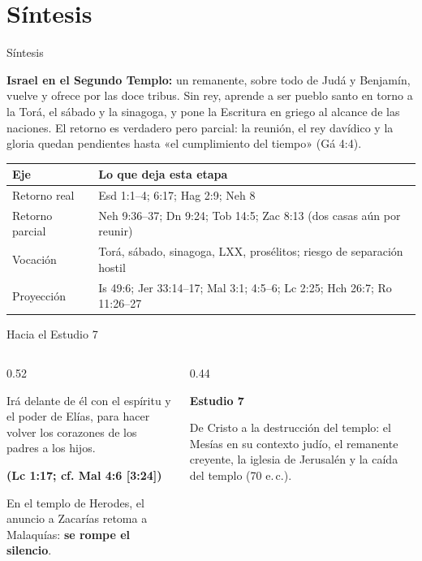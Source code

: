 \documentclass[hyperref={bookmarks=false},aspectratio=169]{beamer}
\newcommand{\fuente}[1]{\par\hfill{\upshape\bfseries\footnotesize\textcolor{ladrillo}{#1}}}
\newcommand{\destacar}[1]{\textbf{\textcolor{ladrillo}{#1}}}
\newcommand{\notafig}[1]{\par\vspace{2pt}{\fontsize{5}{6}\selectfont\color{sepia}\hfill\textit{Nota.} #1\par}}
\newcommand{\elabpropia}{\notafig{Elaboración propia.}}
\begin{document}
\section{Síntesis}
\begin{frame}{Síntesis}
\begin{tcolorbox}[colback=piedra,colframe=ladrillo,boxrule=1pt,arc=3pt,fontupper=\small]
\textbf{\textcolor{cafe}{Israel en el Segundo Templo:}} un remanente, sobre todo de Judá y Benjamín, vuelve y ofrece por las doce tribus. Sin rey, aprende a ser pueblo santo en torno a la Torá, el sábado y la sinagoga, y pone la Escritura en griego al alcance de las naciones. El retorno es verdadero pero parcial: la reunión, el rey davídico y la gloria quedan pendientes hasta «el cumplimiento del tiempo» (Gá 4:4).
\end{tcolorbox}
\centering\footnotesize\renewcommand{\arraystretch}{1.25}
\begin{tabular}{>{\RaggedRight\arraybackslash}p{2.4cm}>{\RaggedRight\arraybackslash}p{9.3cm}}
\toprule
\color{ladrillo}\bfseries Eje & \color{ladrillo}\bfseries Lo que deja esta etapa\\\midrule
Retorno real & Esd 1:1--4; 6:17; Hag 2:9; Neh 8\\
Retorno parcial & Neh 9:36--37; Dn 9:24; Tob 14:5; Zac 8:13 (dos casas aún por reunir)\\
Vocación & Torá, sábado, sinagoga, LXX, prosélitos; riesgo de separación hostil\\
Proyección & Is 49:6; Jer 33:14--17; Mal 3:1; 4:5--6; Lc 2:25; Hch 26:7; Ro 11:26--27\\
\bottomrule
\end{tabular}
\elabpropia
\end{frame}

\begin{frame}{Hacia el Estudio 7}
\begin{columns}[c,onlytextwidth]
\begin{column}{0.52\textwidth}
\begin{cita}Irá delante de él con el espíritu y el poder de Elías, para hacer volver los corazones de los padres a los hijos.\fuente{(Lc 1:17; cf. Mal 4:6 [3:24])}\end{cita}
\small En el templo de Herodes, el anuncio a Zacarías retoma a Malaquías: \destacar{se rompe el silencio}.
\end{column}
\begin{column}{0.44\textwidth}
\begin{tcolorbox}[colback=cafe,colframe=cafeosc,coltext=piedra,boxrule=0.8pt,arc=3pt,fontupper=\small]
\textbf{Estudio 7}\par\smallskip
De Cristo a la destrucción del templo: el Mesías en su contexto judío, el remanente creyente, la iglesia de Jerusalén y la caída del templo (70 e.\,c.).
\end{tcolorbox}
\end{column}
\end{columns}
\end{frame}
\end{document}
